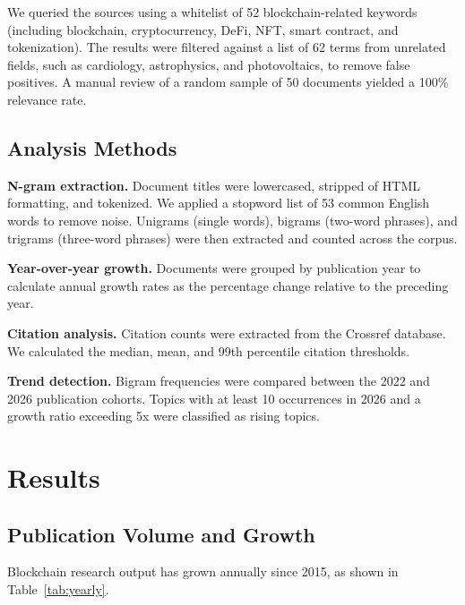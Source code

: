 \documentclass[11pt]{article}
\begin{document}
We queried the sources using a whitelist of 52 blockchain-related keywords (including blockchain, cryptocurrency, DeFi, NFT, smart contract, and tokenization). The results were filtered against a list of 62 terms from unrelated fields, such as cardiology, astrophysics, and photovoltaics, to remove false positives. A manual review of a random sample of 50 documents yielded a 100\% relevance rate.

\subsection{Analysis Methods}

\textbf{N-gram extraction.} Document titles were lowercased, stripped of HTML formatting, and tokenized. We applied a stopword list of 53 common English words to remove noise. Unigrams (single words), bigrams (two-word phrases), and trigrams (three-word phrases) were then extracted and counted across the corpus.

\textbf{Year-over-year growth.} Documents were grouped by publication year to calculate annual growth rates as the percentage change relative to the preceding year.

\textbf{Citation analysis.} Citation counts were extracted from the Crossref database. We calculated the median, mean, and 99th percentile citation thresholds.

\textbf{Trend detection.} Bigram frequencies were compared between the 2022 and 2026 publication cohorts. Topics with at least 10 occurrences in 2026 and a growth ratio exceeding 5x were classified as rising topics.

\section{Results}
\label{sec:results}

\subsection{Publication Volume and Growth}

Blockchain research output has grown annually since 2015, as shown in Table~\ref{tab:yearly}.
\end{document}

